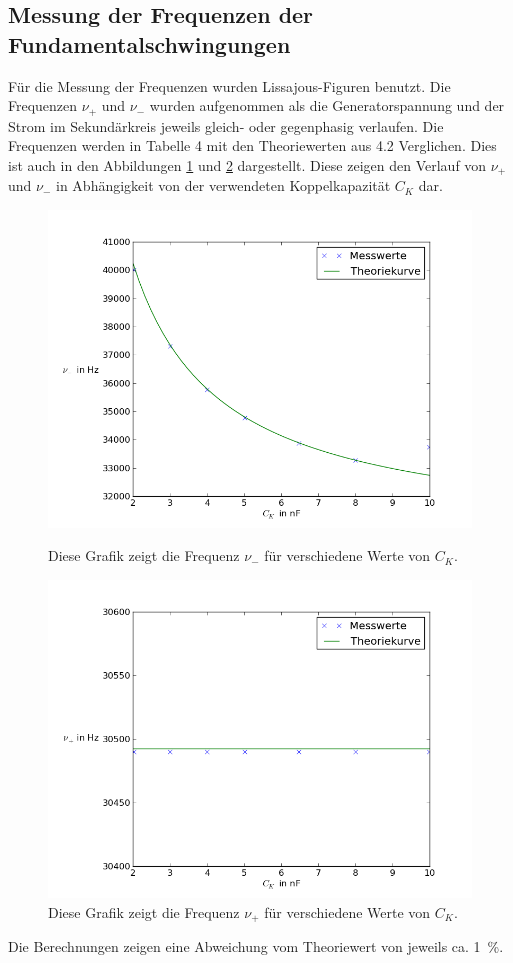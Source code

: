 \documentclass[11pt,ngerman,a4paper]{article}
\begin{document}
\subsection{Messung der Frequenzen der Fundamentalschwingungen}
Für die Messung der Frequenzen wurden Lissajous-Figuren benutzt. Die Frequenzen $\nu_+$ und $\nu_-$ wurden aufgenommen als die Generatorspannung und der Strom im Sekundärkreis jeweils gleich- oder gegenphasig verlaufen. Die Frequenzen werden in Tabelle 4 mit den Theoriewerten aus 4.2 Verglichen. Dies ist auch in den Abbildungen \ref{42} und \ref{43} dargestellt. Diese zeigen den Verlauf von $\nu_+$ und $\nu_-$ in Abhängigkeit von der verwendeten Koppelkapazität $C_K$ dar.
\begin{figure}[h!]
\centering
\includegraphics[scale=0.6]{Abb/diag2.png}
\label{42}
\caption{Diese Grafik zeigt die Frequenz $\nu_-$ für verschiedene Werte von $C_K$.}
\end{figure}
\begin{figure}[h!]
\centering
\includegraphics[scale=0.6]{Abb/diag3.png}
\caption{Diese Grafik zeigt die Frequenz $\nu_+$ für verschiedene Werte von $C_K$.}
\label{43}
\end{figure}
\noindent
Die Berechnungen zeigen eine Abweichung vom Theoriewert von jeweils ca. \SI{1}{\percent}.
\end{document}

